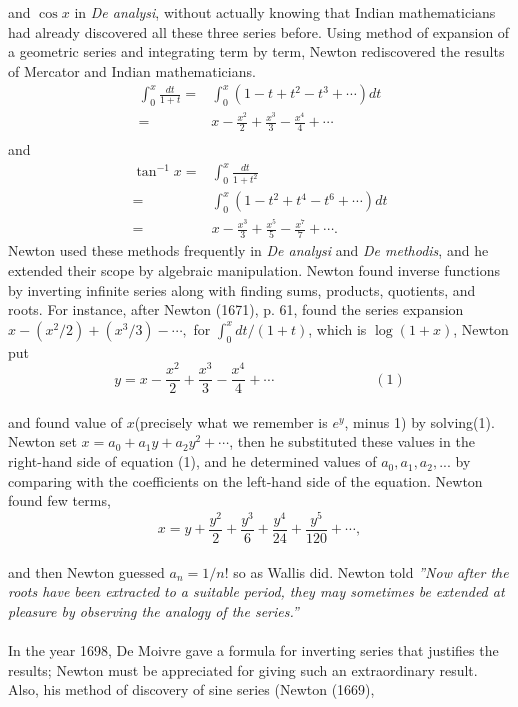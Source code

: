 \documentclass[a4paper,reqno,11pt]{book}
\theoremstyle{plain}%
\theoremstyle{definition}
\begin{document}
and $\cos x$ in \textit{De analysi}, without actually knowing that Indian mathematicians had already discovered all these three series before.
Using method of expansion of a geometric series and integrating term by term, Newton rediscovered the results of Mercator and Indian mathematicians.\\
\begin{align*}
\int_{0}^{x} \frac{dt}{1+t} =& \int_{0}^{x}( 1 - t + t^2 - t^3 + \cdots)dt\\
=& x - \frac{x^2}{2} + \frac{x^3}{3} - \frac{x^4}{4} + \cdots\\
\end{align*}
and
\begin{align*}
\tan^{-1}x =& \int_{0}^{x}\frac{dt}{1+t^2}\\
=& \int_{0}^{x} (1 - t^2 + t^4 - t^6 + \cdots)dt\\
=& x - \frac{x^3}{3} + \frac{x^5}{5} - \frac{x^7}{7} + \cdots.
\end{align*}
Newton used these methods frequently in \textit{De analysi} and \textit{De methodis}, and he extended their scope by algebraic manipulation. Newton found inverse functions by inverting infinite series along with finding sums,
products, quotients, and roots. For instance, after Newton (1671), p. 61, found the series expansion $x - (x^2/2) + (x^3/3) - \cdots,$
for $\int_{0}^{x} dt/(1 + t)$, which is $\log(1 + x)$, Newton put\\
$$y = x - \frac{x^2}{2} + \frac{x^3}{3} - \frac{x^4}{4} + \cdots \hspace{3cm} (1)$$\\
and found value of $x$(precisely what we remember is $e^{y}$, minus 1) by solving(1). Newton set $x = a_{0} + a_{1}y + a_{2}y^2 + \cdots$, then he substituted these values in the right-hand side of equation (1), and he determined values of  $a_{0}, a_{1}, a_{2},...$
by comparing with the coefficients on the left-hand side of the equation.
Newton found few terms,\\
$$x = y + \frac{y^2}{2} + \frac{y^3}{6} + \frac{y^4}{24} + \frac{y^5}{120} + \cdots,$$\\
and then Newton guessed $a_{n} = 1/n!$ so as Wallis did. Newton told \textit{''Now after the roots have been extracted to a suitable period, they may
sometimes be extended at pleasure by observing the analogy of the series.”}\\
\\
\indent In the year 1698, De Moivre gave a formula for inverting series that justifies the results; Newton must be appreciated for giving such an extraordinary result. Also, his method of discovery of sine series (Newton (1669),
\end{document}
